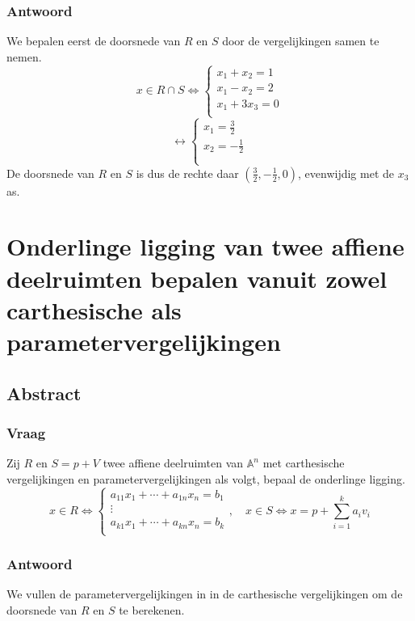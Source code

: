 \documentclass[main.tex]{subfiles}
\begin{document}
\subsubsection*{Antwoord}
We bepalen eerst de doorsnede van $R$ en $S$ door de vergelijkingen samen te nemen.
\[
  x\in R \cap S \Leftrightarrow
  \left\{
    \begin{array}{c}
      x_{1}+x_{2}=1\\
      x_{1}-x_{2} = 2\\
      x_{1} + 3x_{3} = 0\\
    \end{array}
  \right.
\]
\[
\leftrightarrow
  \left\{
    \begin{array}{c}
      x_{1}=\frac{3}{2}\\
      x_{2}=-\frac{1}{2}\\
      \\
    \end{array}
  \right.
\]
De doorsnede van $R$ en $S$ is dus de rechte daar $(\frac{3}{2},-\frac{1}{2},0)$, evenwijdig met de $x_{3}$ as.

\newpage
\section{Onderlinge ligging van twee affiene deelruimten bepalen vanuit zowel carthesische als parametervergelijkingen}
\subsection*{Abstract}
\subsubsection*{Vraag}
\begin{center}
  Zij $R$ en $S=p+V$ twee affiene deelruimten van $\mathbb{A}^{n}$ met carthesische vergelijkingen en parametervergelijkingen als volgt, bepaal de onderlinge ligging.
  \[
  x \in R \Leftrightarrow
  \left\{
    \begin{array}{c}
      a_{11}x_{1} + \dotsb + a_{1n}x_{n} = b_{1}\\
      \vdots\\
      a_{k1}x_{1} + \dotsb + a_{kn}x_{n} = b_{k}\\
    \end{array}
  \right.
  ,\quad
  x\in S \Leftrightarrow
  x= p+ \sum_{i=1}^{k}a_{i}v_{i}
  \]
\end{center}

\subsubsection*{Antwoord}
We vullen de parametervergelijkingen in in de carthesische vergelijkingen om de doorsnede van $R$ en $S$ te berekenen.
\end{document}
